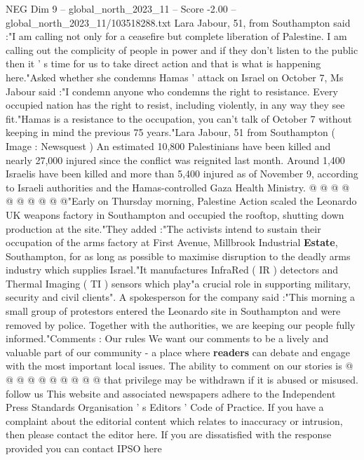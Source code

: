\begin{textsample}{NEG Dim 9 – global\_north\_2023\_11 – Score -2.00 – global\_north\_2023\_11/103518288.txt}  \label{ex:f9_neg_300}
Lara Jabour, 51, from Southampton said :"I am calling not only for a ceasefire but complete liberation of Palestine.
I am calling out the complicity of people in power and if they don't listen to the public then it ' s time for us to take direct action and that is what is happening here."Asked whether she condemns Hamas ' attack on Israel on October 7, Ms Jabour said :"I condemn anyone who condemns the right to resistance.
Every occupied nation has the right to resist, including violently, in any way they see fit."Hamas is a resistance to the occupation, you can't talk of October 7 without keeping in mind the previous 75 years."Lara Jabour, 51 from Southampton ( Image : Newsquest ) An estimated 10,800 Palestinians have been killed and nearly 27,000 injured since the conflict was reignited last month.
Around 1,400 Israelis have been killed and more than 5,400 injured as of November 9, according to Israeli authorities and the Hamas-controlled Gaza Health Ministry. @ @ @ @ @ @ @ @ @ @"Early on Thursday morning, Palestine Action scaled the Leonardo UK weapons factory in Southampton and occupied the rooftop, shutting down production at the site."They added :"The activists intend to sustain their occupation of the arms factory at First Avenue, Millbrook Industrial \textbf{Estate}, Southampton, for as long as possible to maximise disruption to the deadly arms industry which supplies Israel."It manufactures InfraRed ( IR ) detectors and Thermal Imaging ( TI ) sensors which play"a crucial role in supporting military, security and civil clients".
A spokesperson for the company said :"This morning a small group of protestors entered the Leonardo site in Southampton and were removed by police.
Together with the authorities, we are keeping our people fully informed."Comments : Our rules We want our comments to be a lively and valuable part of our community - a place where \textbf{readers} can debate and engage with the most important local issues.
The ability to comment on our stories is @ @ @ @ @ @ @ @ @ @ that privilege may be withdrawn if it is abused or misused. follow us This website and associated newspapers adhere to the Independent Press Standards Organisation ' s Editors ' Code of Practice.
If you have a complaint about the editorial content which relates to inaccuracy or intrusion, then please contact the editor here.
If you are dissatisfied with the response provided you can contact IPSO here

\end{textsample}
